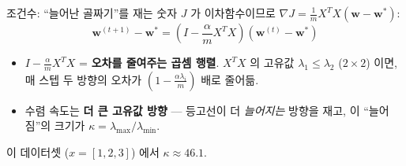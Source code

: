 \begin{frame}{조건수: ``늘어난 골짜기''를 재는 숫자}
  $J$ 가 이차함수이므로 $\nabla J = \frac{1}{m}X^TX(\boldsymbol{w} - \boldsymbol{w}^{*})$:
  \[
  \boldsymbol{w}^{(t+1)} - \boldsymbol{w}^{*} = \left(I - \frac{\alpha}{m}X^TX\right)(\boldsymbol{w}^{(t)} - \boldsymbol{w}^{*})
  \]
  \begin{itemize}
    \item $I - \frac{\alpha}{m}X^TX$ = \textbf{오차를 줄여주는 곱셈
      행렬}. $X^TX$ 의 고유값 $\lambda_1 \le \lambda_2$ ($2 \times 2$)
      이면, 매 스텝 두 방향의 오차가 $(1 - \frac{\alpha \lambda_i}{m})$
      배로 줄어듦.
    \item 수렴 속도는 \textbf{더 큰 고유값 방향} --- 등고선이 더
      \emph{늘어지는} 방향을 재고, 이 ``늘어짐''의 크기가 
      $\kappa = \lambda_{\max}/\lambda_{\min}$.
  \end{itemize}
  이 데이터셋 ($x=[1,2,3]$) 에서 $\kappa \approx 46.1$.
\end{frame}

